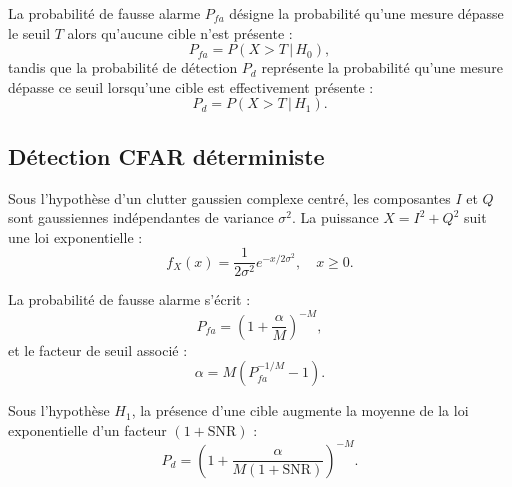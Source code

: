 
La probabilité de fausse alarme $P_{fa}$ désigne la probabilité qu’une mesure dépasse le seuil $T$ alors qu’aucune cible n’est présente :
\begin{equation}
P_{fa} = P(X > T \,|\, H_0),
\end{equation}
tandis que la probabilité de détection $P_d$ représente la probabilité qu’une mesure dépasse ce seuil lorsqu’une cible est effectivement présente :
\begin{equation}
P_d = P(X > T \,|\, H_1).
\end{equation}


\subsection{Détection CFAR déterministe}

Sous l’hypothèse d’un clutter gaussien complexe centré, les composantes $I$ et $Q$ sont gaussiennes indépendantes de variance $\sigma^2$.  
La puissance $X = I^2 + Q^2$ suit une loi exponentielle :
\begin{equation}
f_X(x) = \frac{1}{2\sigma^2} e^{-x / 2\sigma^2}, \quad x \ge 0.
\end{equation}

La probabilité de fausse alarme s’écrit :
\begin{equation}
P_{fa} = \left( 1 + \frac{\alpha}{M} \right)^{-M},
\end{equation}
et le facteur de seuil associé :
\begin{equation}
\alpha = M \left( P_{fa}^{-1/M} - 1 \right).
\end{equation}

Sous l’hypothèse $H_1$, la présence d’une cible augmente la moyenne de la loi exponentielle d’un facteur $(1+\mathrm{SNR})$ :
\begin{equation}
P_d = \left( 1 + \frac{\alpha}{M(1+\mathrm{SNR})} \right)^{-M}.
\end{equation}


